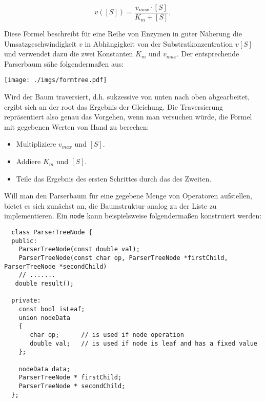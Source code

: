 \documentclass[paper=A4, pagesize, DIV=calc, smallheadings,
fontsize=11pt, expansion=false]{scrreprt}
\begin{document}
\[ v([S]) = \frac{v_{max} \cdot [S]}{K_m + [S]},\]

Diese Formel beschreibt für eine Reihe von Enzymen in guter Näherung die Umsatzgeschwindigkeit $v$ in Abhängigkeit von der Substratkonzentration $v[S]$ und verwendet dazu die zwei Konstanten $K_m$ und $v_{max}$. 
Der entsprechende Parserbaum sähe folgendermaßen aus:
\begin{center}
\texttt{[image: ./imgs/formtree.pdf]}
\end{center}

Wird der Baum traversiert, d.h. sukzessive von unten nach oben abgearbeitet, ergibt sich an der root das Ergebnis der Gleichung.
Die Traversierung repräsentiert also genau das Vorgehen, wenn man versuchen würde, die Formel mit gegebenen Werten von Hand zu berechen: 
\begin{itemize}
\item Multipliziere $v_{max}$ und $[S]$.
\item Addiere $K_m$ und $[S]$.
\item Teile das Ergebnis des ersten Schrittes durch das des Zweiten.
\end{itemize}

Will man den Parserbaum für eine gegebene Menge von Operatoren aufstellen, bietet es sich zunächst an, die Baumstruktur analog zu der Liste zu implementieren. 
Ein \texttt{node} kann beispielsweise folgendermaßen konstruiert werden:

\begin{verbatim}
  class ParserTreeNode {
  public:
    ParserTreeNode(const double val);
    ParserTreeNode(const char op, ParserTreeNode *firstChild, ParserTreeNode *secondChild)
    // .......
   double result();

  private:
    const bool isLeaf;
    union nodeData
    {  
       char op;      // is used if node operation   
       double val;   // is used if node is leaf and has a fixed value
    };

    nodeData data;
    ParserTreeNode * firstChild;
    ParserTreeNode * secondChild;
  };
\end{verbatim}
\end{document}
